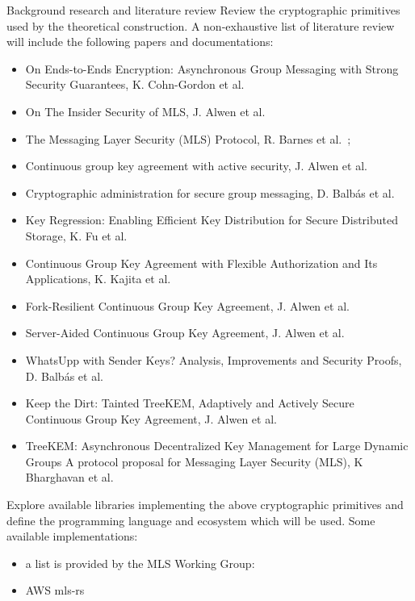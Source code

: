 \documentclass[E]{BAMASA}
\begin{document}
\tasks
\begin{workpackage}{Background research and literature review}\label{wp:background}
Review the cryptographic primitives used by the theoretical construction. A non-exhaustive list of literature review will include the following papers and documentations:
\begin{itemize}
    \item On Ends-to-Ends Encryption: Asynchronous Group Messaging with Strong Security Guarantees, K. Cohn-Gordon et al.~\cite{CCS:CCGMM18}
    \item On The Insider Security of MLS, J. Alwen et al.~\cite{CCS:AHKM22}
    \item The Messaging Layer Security (MLS) Protocol, R. Barnes et al.~\cite{rfc9420};
    \item Continuous group key agreement with active security, J. Alwen et al.~\cite{TCC:ACJM20}
    \item  Cryptographic administration for secure
group messaging, D. Balb\'as et al.~\cite{USENIX:BalColVau23}
    \item Key Regression: Enabling Efficient Key Distribution for Secure Distributed Storage, K. Fu et al.~\cite{NDSS:FuKamKoh06}
    \item Continuous Group Key Agreement with Flexible Authorization and Its Applications, K. Kajita et al.~\cite{IWSPA:KEONO23}
    \item Fork-Resilient Continuous Group Key Agreement, J. Alwen et al.~\cite{C:AlwMulTse23}
    \item Server-Aided Continuous Group Key Agreement, J. Alwen et al.~\cite{CCS:AHKM22}
    \item WhatsUpp with Sender Keys? Analysis, Improvements and Security Proofs, D. Balb\'as et al.~\cite{AC:BalColGaj23}
    \item Keep the Dirt: Tainted TreeKEM, Adaptively and Actively Secure Continuous Group Key Agreement, J. Alwen et al.~\cite{SP:KPWKCCMYAP21}
    \item TreeKEM: Asynchronous Decentralized Key Management for Large Dynamic Groups A protocol proposal for Messaging Layer Security (MLS), K Bharghavan et al.~\cite{TreeKEM}
\end{itemize} 

Explore available libraries implementing the above cryptographic primitives and define the programming language and ecosystem which will be used. 
Some available implementations:
\begin{itemize}
    \item a list is provided by the MLS Working Group:~\cite{MLSWGimpl}
    \item AWS mls-rs~\cite{AWSMLSrs}
\end{itemize}


\end{workpackage}
\end{document}
